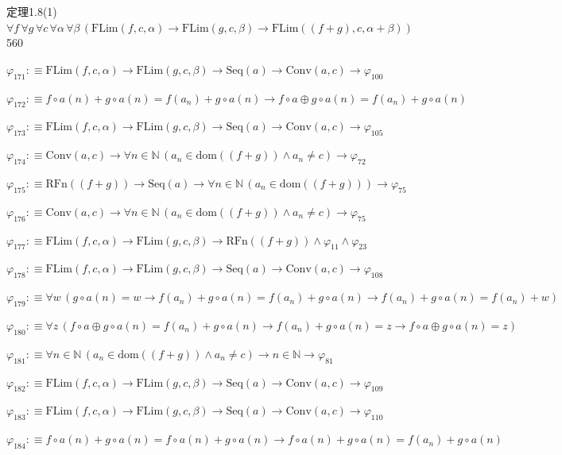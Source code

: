 \begin{fullproof}{定理1.8(1)}{$\forall f\,\forall g\,\forall c\,\forall \alpha\,\forall \beta\,(\mathrm{FLim}(f,c,\alpha) \to \mathrm{FLim}(g,c,\beta) \to \mathrm{FLim}((f + g),c,\alpha + \beta))$}{560}
\begin{abbrevlist}
\item $\varphi_{171} :\equiv \mathrm{FLim}(f,c,\alpha) \to \mathrm{FLim}(g,c,\beta) \to \mathrm{Seq}(a) \to \mathrm{Conv}(a,c) \to \varphi_{100}$
\item $\varphi_{172} :\equiv f \circ a(n) + g \circ a(n) = f(a_{n}) + g \circ a(n) \to f \circ a \oplus g \circ a(n) = f(a_{n}) + g \circ a(n)$
\item $\varphi_{173} :\equiv \mathrm{FLim}(f,c,\alpha) \to \mathrm{FLim}(g,c,\beta) \to \mathrm{Seq}(a) \to \mathrm{Conv}(a,c) \to \varphi_{105}$
\item $\varphi_{174} :\equiv \mathrm{Conv}(a,c) \to \forall n \in \mathbb{N}\,(a_{n} \in \mathrm{dom}((f + g)) \land a_{n} \neq c) \to \varphi_{72}$
\item $\varphi_{175} :\equiv \mathrm{RFn}((f + g)) \to \mathrm{Seq}(a) \to \forall n \in \mathbb{N}\,(a_{n} \in \mathrm{dom}((f + g))) \to \varphi_{75}$
\item $\varphi_{176} :\equiv \mathrm{Conv}(a,c) \to \forall n \in \mathbb{N}\,(a_{n} \in \mathrm{dom}((f + g)) \land a_{n} \neq c) \to \varphi_{75}$
\item $\varphi_{177} :\equiv \mathrm{FLim}(f,c,\alpha) \to \mathrm{FLim}(g,c,\beta) \to \mathrm{RFn}((f + g)) \land \varphi_{11} \land \varphi_{23}$
\item $\varphi_{178} :\equiv \mathrm{FLim}(f,c,\alpha) \to \mathrm{FLim}(g,c,\beta) \to \mathrm{Seq}(a) \to \mathrm{Conv}(a,c) \to \varphi_{108}$
\item $\varphi_{179} :\equiv \forall w\,(g \circ a(n) = w \to f(a_{n}) + g \circ a(n) = f(a_{n}) + g \circ a(n) \to f(a_{n}) + g \circ a(n) = f(a_{n}) + w)$
\item $\varphi_{180} :\equiv \forall z\,(f \circ a \oplus g \circ a(n) = f(a_{n}) + g \circ a(n) \to f(a_{n}) + g \circ a(n) = z \to f \circ a \oplus g \circ a(n) = z)$
\item $\varphi_{181} :\equiv \forall n \in \mathbb{N}\,(a_{n} \in \mathrm{dom}((f + g)) \land a_{n} \neq c) \to n \in \mathbb{N} \to \varphi_{81}$
\item $\varphi_{182} :\equiv \mathrm{FLim}(f,c,\alpha) \to \mathrm{FLim}(g,c,\beta) \to \mathrm{Seq}(a) \to \mathrm{Conv}(a,c) \to \varphi_{109}$
\item $\varphi_{183} :\equiv \mathrm{FLim}(f,c,\alpha) \to \mathrm{FLim}(g,c,\beta) \to \mathrm{Seq}(a) \to \mathrm{Conv}(a,c) \to \varphi_{110}$
\item $\varphi_{184} :\equiv f \circ a(n) + g \circ a(n) = f \circ a(n) + g \circ a(n) \to f \circ a(n) + g \circ a(n) = f(a_{n}) + g \circ a(n)$

\end{abbrevlist}
\end{fullproof}
